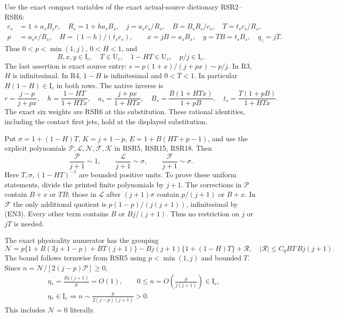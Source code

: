 Use the exact compact variables of the exact actual-source
dictionary RSR2--RSR6:
\[
\begin{aligned}
c_s&=1+a_sB_sr,\quad R_s=1+ha_sB_s,\quad
j=a_sc_s/R_s,\quad B=B_sR_s/c_s,\quad T=t_sc_s/R_s,\\
p&=a_s e/R_s,\quad H=(1-h)/(t_sc_s),\qquad
x=jB=a_sB_s,\quad y=TB=t_sB_s,\quad q_z=jT .
\end{aligned}                                                    \tag{EN2}
\]
Thus $0<p<\min(1,j)$, $0<H<1$, and
\[
B,x,y\in\mathrm I_c,\quad T\in\mathrm U_c,\quad
1-HT\in\mathrm U_c,\quad p/j\in\mathrm I_c.              \tag{EN3}
\]
The last assertion is exact source entry:
$e=p(1+x)/(j+px)\sim p/j$.
In R3, $H$ is infinitesimal. In R4, $1-H$ is infinitesimal
and $0<\overline T<1$. In particular
$H(1-H)\in\mathrm I_c$ in both rows.
The native inverse is
\[
r=\frac{j-p}{j+px},\quad h=\frac{1-HT}{1+HTx},\quad
a_s=\frac{j+px}{1+HTx},\quad
B_s=\frac{B(1+HTx)}{1+pB},\quad
t_s=\frac{T(1+pB)}{1+HTx}.                              \tag{EN4}
\]
The exact six weights are RSR6 at this substitution.
These rational identities, including the contact first jets, hold at the displayed substitution.

Put $\sigma=1+(1-H)T$, $K=j+1-p$, $E=1+B(HT+p-1)$, and
use the explicit polynomials $\mathcal P,\mathcal L,\mathcal N,
\mathcal F,\mathcal K$ in RSR5, RSR15, RSR18. Then
\[
\frac{\mathcal P}{j+1}\sim1,\qquad
\frac{\mathcal L}{j+1}\sim\sigma,\qquad
\frac{\mathcal F}{j+1}\sim\sigma.                       \tag{EN5}
\]
Here $T,\sigma,(1-HT)^{-1}$ are bounded positive units.
To prove these uniform statements, divide the printed finite
polynomials by $j+1$. The corrections in $\mathcal P$ contain
$B+x$ or $TB$; those in $\mathcal L$ after
$(j+1)\sigma$ contain $p/(j+1)$ or $B+x$.
In $\mathcal F$ the only additional quotient is
$p(1-p)/(j(j+1))$, infinitesimal by (EN3).
Every other term contains $B$ or $Bj/(j+1)$.
Thus no restriction on $j$ or $jT$ is needed.

The exact physicality numerator has the grouping
\[
\mathcal N=p\{1+B(3j+1-p)+BT(j+1)\}
-Bj(j+1)\{1+(1-H)T\}+\mathcal R,\quad
|\mathcal R|\le C_0BT\,Bj(j+1).                         \tag{EN6}
\]
The bound follows termwise from RSR5 using $p<\min(1,j)$ and
bounded $T$. Since $n=\mathcal N/[2(j-p)\mathcal P]\ge0$,
\[
\begin{aligned}
&\eta_*=\frac{Bj(j+1)}p=O(1),\qquad
0\le n=O\!\left(\frac{p}{j(j+1)}\right)\in\mathrm I_c,\\
&\eta_*\in\mathrm I_c\Longrightarrow
n\sim\frac{p}{2(j-p)(j+1)}>0 .
\end{aligned}                                                    \tag{EN7}
\]
This includes $\mathcal N=0$ literally.


